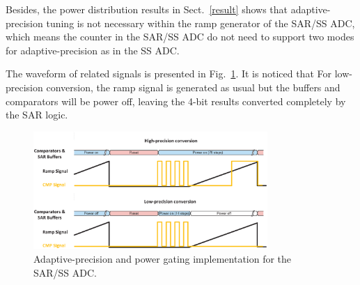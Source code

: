 Besides, the power distribution results in Sect.~\ref{result} shows that adaptive-precision tuning is not necessary within the ramp generator of the SAR/SS ADC, which means the counter in the SAR/SS ADC do not need to support two modes for adaptive-precision as in the SS ADC.

The waveform of related signals is presented in Fig.~\ref{SAR_pg}. It is noticed that For low-precision conversion, the ramp signal is generated as usual but the buffers and comparators will be power off, leaving the 4-bit results converted completely by the SAR logic. 

\begin{figure}[htbp]
	\centerline{\includegraphics[width=3.5in]{./Figures/SAR_pg.eps}}
	\caption{Adaptive-precision and power gating implementation for the SAR/SS ADC.}
	\label{SAR_pg}
\end{figure} 
